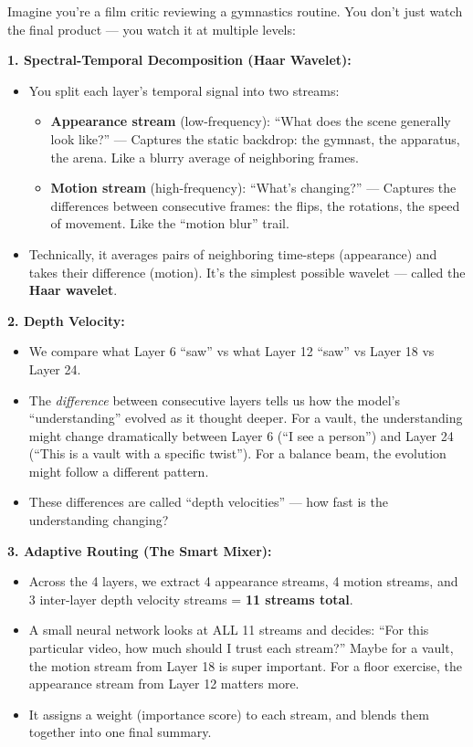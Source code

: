 \documentclass[12pt, a4paper]{article}
\begin{document}
\begin{analogybox}
Imagine you're a film critic reviewing a gymnastics routine. You don't just watch the final product — you watch it at multiple levels:

\textbf{1. Spectral-Temporal Decomposition (Haar Wavelet):}
\begin{itemize}
    \item You split each layer's temporal signal into two streams:
    \begin{itemize}
        \item \textbf{Appearance stream} (low-frequency): ``What does the scene generally look like?'' — Captures the static backdrop: the gymnast, the apparatus, the arena. Like a blurry average of neighboring frames.
        \item \textbf{Motion stream} (high-frequency): ``What's changing?'' — Captures the differences between consecutive frames: the flips, the rotations, the speed of movement. Like the ``motion blur'' trail.
    \end{itemize}
    \item Technically, it averages pairs of neighboring time-steps (appearance) and takes their difference (motion). It's the simplest possible wavelet — called the \textbf{Haar wavelet}.
\end{itemize}

\textbf{2. Depth Velocity:}
\begin{itemize}
    \item We compare what Layer 6 ``saw'' vs what Layer 12 ``saw'' vs Layer 18 vs Layer 24.
    \item The \textit{difference} between consecutive layers tells us how the model's ``understanding'' evolved as it thought deeper. For a vault, the understanding might change dramatically between Layer 6 (``I see a person'') and Layer 24 (``This is a vault with a specific twist''). For a balance beam, the evolution might follow a different pattern.
    \item These differences are called ``depth velocities'' — how fast is the understanding changing?
\end{itemize}

\textbf{3. Adaptive Routing (The Smart Mixer):}
\begin{itemize}
    \item Across the 4 layers, we extract 4 appearance streams, 4 motion streams, and 3 inter-layer depth velocity streams = \textbf{11 streams total}.
    \item A small neural network looks at ALL 11 streams and decides: ``For this particular video, how much should I trust each stream?'' Maybe for a vault, the motion stream from Layer 18 is super important. For a floor exercise, the appearance stream from Layer 12 matters more.
    \item It assigns a weight (importance score) to each stream, and blends them together into one final summary.
\end{itemize}


\end{analogybox}
\end{document}
